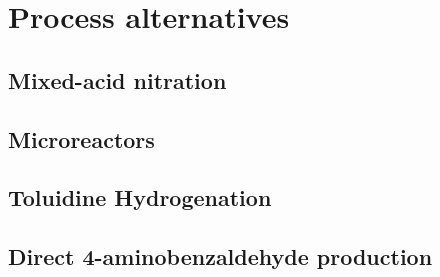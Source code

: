 \section{Process alternatives}
\label{app:alternatives}

\subsection{Mixed-acid nitration}
\label{mixed}

\subsection{Microreactors}
\label{microreactor}

\subsection{Toluidine Hydrogenation}
\label{toluidine}



\subsection{Direct 4-aminobenzaldehyde production}
\label{direct}